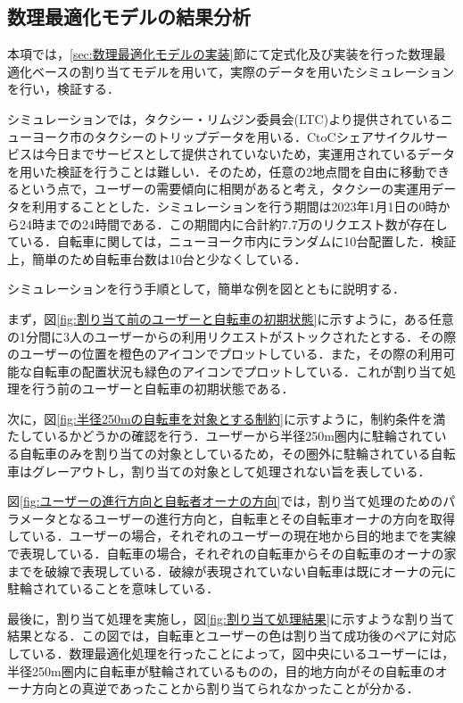       \subsection{数理最適化モデルの結果分析}
        \label{sec:数理最適化モデルの結果分析}
          \par 本項では，\ref{sec:数理最適化モデルの実装}節にて定式化及び実装を行った数理最適化ベースの割り当てモデルを用いて，実際のデータを用いたシミュレーションを行い，検証する．
          \par シミュレーションでは，タクシー・リムジン委員会(LTC)より提供されているニューヨーク市のタクシーのトリップデータ\cite{YellowTaxiTripRecords}を用いる．CtoCシェアサイクルサービスは今日までサービスとして提供されていないため，実運用されているデータを用いた検証を行うことは難しい．そのため，任意の2地点間を自由に移動できるという点で，ユーザーの需要傾向に相関があると考え，タクシーの実運用データを利用することとした．シミュレーションを行う期間は2023年1月1日の0時から24時までの24時間である．この期間内に合計約7.7万のリクエスト数が存在している．自転車に関しては，ニューヨーク市内にランダムに10台配置した．検証上，簡単のため自転車台数は10台と少なくしている．
          \par シミュレーションを行う手順として，簡単な例を図とともに説明する．
          \par まず，図\ref{fig:割り当て前のユーザーと自転車の初期状態}に示すように，ある任意の1分間に3人のユーザーからの利用リクエストがストックされたとする．その際のユーザーの位置を橙色のアイコンでプロットしている．また，その際の利用可能な自転車の配置状況も緑色のアイコンでプロットしている．これが割り当て処理を行う前のユーザーと自転車の初期状態である．
          \par 次に，図\ref{fig:半径250mの自転車を対象とする制約}に示すように，制約条件を満たしているかどうかの確認を行う．ユーザーから半径250m圏内に駐輪されている自転車のみを割り当ての対象としているため，その圏外に駐輪されている自転車はグレーアウトし，割り当ての対象として処理されない旨を表している．
          \par 図\ref{fig:ユーザーの進行方向と自転者オーナの方向}では，割り当て処理のためのパラメータとなるユーザーの進行方向と，自転車とその自転車オーナの方向を取得している．ユーザーの場合，それぞれのユーザーの現在地から目的地までを実線で表現している．自転車の場合，それぞれの自転車からその自転車のオーナの家までを破線で表現している．破線が表現されていない自転車は既にオーナの元に駐輪されていることを意味している．
          \par 最後に，割り当て処理を実施し，図\ref{fig:割り当て処理結果}に示すような割り当て結果となる．この図では，自転車とユーザーの色は割り当て成功後のペアに対応している．数理最適化処理を行ったことによって，図中央にいるユーザーには，半径250m圏内に自転車が駐輪されているものの，目的地方向がその自転車のオーナ方向との真逆であったことから割り当てられなかったことが分かる．
